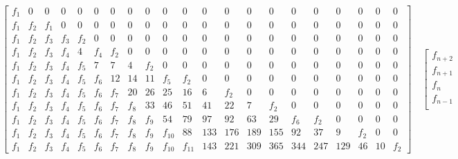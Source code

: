\documentclass[a4paper,dottedtoc,headinclude,footinclude]{report} %
\theoremstyle{plain}
\begin{document}
    \begin{table}
        \begin{displaymath}
            \left[
                \begin{array}{ccccccccccccccccccccc}
                f_{1} & 0 & 0 & 0 & 0 & 0 & 0 & 0 & 0 & 0 & 0 & 0 & 0 & 0 & 0 & 0 & 0 & 0 & 0 & 0 & 0\\
                f_{1} & f_{2} & f_{1} & 0 & 0 & 0 & 0 & 0 & 0 & 0 & 0 & 0 & 0 & 0 & 0 & 0 & 0 & 0 & 0 & 0 & 0\\
                f_{1} & f_{2} & f_{3} & f_{3} & f_{2} & 0 & 0 & 0 & 0 & 0 & 0 & 0 & 0 & 0 & 0 & 0 & 0 & 0 & 0 & 0 & 0\\
                f_{1} & f_{2} & f_{3} & f_{4} & 4 & f_{4} & f_{2} & 0 & 0 & 0 & 0 & 0 & 0 & 0 & 0 & 0 & 0 & 0 & 0 & 0 & 0\\
                f_{1} & f_{2} & f_{3} & f_{4} & f_{5} & 7 & 7 & 4 & f_{2} & 0 & 0 & 0 & 0 & 0 & 0 & 0 & 0 & 0 & 0 & 0 & 0\\
                f_{1} & f_{2} & f_{3} & f_{4} & f_{5} & f_{6} & 12 & 14 & 11 & f_{5} & f_{2} & 0 & 0 & 0 & 0 & 0 & 0 & 0 & 0 & 0 & 0\\
                f_{1} & f_{2} & f_{3} & f_{4} & f_{5} & f_{6} & f_{7} & 20 & 26 & 25 & 16 & 6 & f_{2} & 0 & 0 & 0 & 0 & 0 & 0 & 0 & 0\\
                f_{1} & f_{2} & f_{3} & f_{4} & f_{5} & f_{6} & f_{7} & f_{8} & 33 & 46 & 51 & 41 & 22 & 7 & f_{2} & 0 & 0 & 0 & 0 & 0 & 0\\
                f_{1} & f_{2} & f_{3} & f_{4} & f_{5} & f_{6} & f_{7} & f_{8} & f_{9} & 54 & 79 & 97 & 92 & 63 & 29 & f_{6} & f_{2} & 0 & 0 & 0 & 0\\
                f_{1} & f_{2} & f_{3} & f_{4} & f_{5} & f_{6} & f_{7} & f_{8} & f_{9} & f_{10} & 88 & 133 & 176 & 189 & 155 & 92 & 37 & 9 & f_{2} & 0 & 0\\
                f_{1} & f_{2} & f_{3} & f_{4} & f_{5} & f_{6} & f_{7} & f_{8} & f_{9} & f_{10} & f_{11} & 143 & 221 & 309 & 365 & 344 & 247 & 129 & 46 & 10 & f_{2}
                \end{array}
                \right]  \quad %
                \left[
                    \begin{array}{c}
                        f_{n + 2}\\
                        f_{n + 1}\\
                        f_{n}\\
                        f_{n - 1}\\

\end{array}
\end{displaymath}
\end{table}
\end{document}
